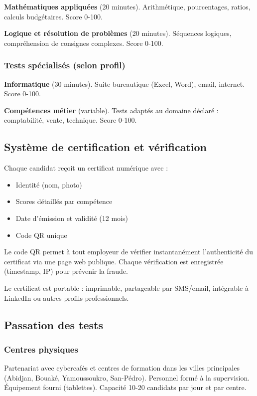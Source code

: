 \documentclass[12pt]{article}
\begin{document}
\textbf{Mathématiques appliquées} (20 minutes). Arithmétique, pourcentages, ratios, calculs budgétaires. Score 0-100.

\textbf{Logique et résolution de problèmes} (20 minutes). Séquences logiques, compréhension de consignes complexes. Score 0-100.

\subsubsection{Tests spécialisés (selon profil)}

\textbf{Informatique} (30 minutes). Suite bureautique (Excel, Word), email, internet. Score 0-100.

\textbf{Compétences métier} (variable). Tests adaptés au domaine déclaré : comptabilité, vente, technique. Score 0-100.

\subsection{Système de certification et vérification}

Chaque candidat reçoit un certificat numérique avec :
\begin{itemize}
    \item Identité (nom, photo)
    \item Scores détaillés par compétence
    \item Date d'émission et validité (12 mois)
    \item Code QR unique
\end{itemize}

Le code QR permet à tout employeur de vérifier instantanément l'authenticité du certificat via une page web publique. Chaque vérification est enregistrée (timestamp, IP) pour prévenir la fraude.

Le certificat est portable : imprimable, partageable par SMS/email, intégrable à LinkedIn ou autres profils professionnels.

\subsection{Passation des tests}

\subsubsection{Centres physiques}

Partenariat avec cybercafés et centres de formation dans les villes principales (Abidjan, Bouaké, Yamoussoukro, San-Pédro). Personnel formé à la supervision. Équipement fourni (tablettes). Capacité 10-20 candidats par jour et par centre.
\end{document}
